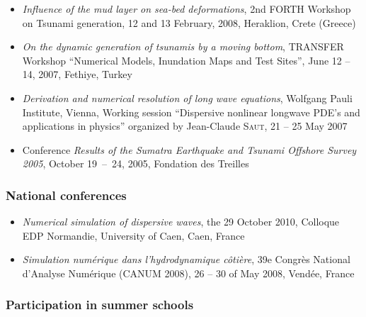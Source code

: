 \documentclass[final, a4paper, oneside, 12pt]{article}
\numberwithin{equation}{section}
\begin{document}
\begin{itemize}
  \item \textit{Influence of the mud layer on sea-bed deformations}, 2nd FORTH Workshop on Tsunami generation, 12 and 13 February, 2008, Heraklion, Crete (Greece)
  
  \item \textit{On the dynamic generation of tsunamis by a moving bottom}, TRANSFER Workshop ``Numerical Models, Inundation Maps and Test Sites'', June 12 -- 14, 2007, Fethiye, Turkey
  
  \item \textit{Derivation and numerical resolution of long wave equations}, Wolfgang Pauli Institute, Vienna, Working session ``Dispersive nonlinear longwave PDE's and applications in physics'' organized by Jean-Claude \textsc{Saut}, 21 -- 25 May 2007

  \item Conference \og \textit{Results of the Sumatra Earthquake and Tsunami Offshore Survey 2005}\fg{}, October 19~--~24, 2005, Fondation des Treilles
\end{itemize}

\subsubsection{National conferences}

\begin{itemize}

  \item \textit{Numerical simulation of dispersive waves}, the 29 October 2010, Colloque EDP Normandie, University of Caen, Caen, France
  
  \item \textit{Simulation num\'erique dans l'hydrodynamique c\^oti\`ere}, 39e Congr\`es National d'Analyse Num\'erique (CANUM 2008), 26 -- 30 of May 2008, Vend\'ee, France
  
\end{itemize}

\subsubsection{Participation in summer schools}
\end{document}
